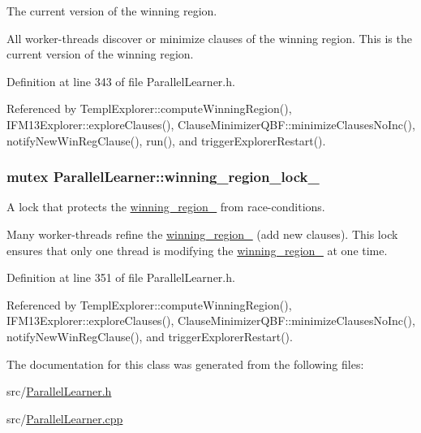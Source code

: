 The current version of the winning region. 

All worker-\/threads discover or minimize clauses of the winning region. This is the current version of the winning region. 

Definition at line 343 of file Parallel\-Learner.\-h.



Referenced by Templ\-Explorer\-::compute\-Winning\-Region(), I\-F\-M13\-Explorer\-::explore\-Clauses(), Clause\-Minimizer\-Q\-B\-F\-::minimize\-Clauses\-No\-Inc(), notify\-New\-Win\-Reg\-Clause(), run(), and trigger\-Explorer\-Restart().

\hypertarget{classParallelLearner_a196a4500dfd66a4b9110659b4a10dead}{
\subsubsection[{winning\-\_\-region\-\_\-lock\-\_\-}]{\setlength{\rightskip}{0pt plus 5cm}mutex Parallel\-Learner\-::winning\-\_\-region\-\_\-lock\-\_\-}}\label{classParallelLearner_a196a4500dfd66a4b9110659b4a10dead}


A lock that protects the \hyperlink{classParallelLearner_a7c8383543ff98d7a0356a237756dcdd6}{winning\-\_\-region\-\_\-} from race-\/conditions. 

Many worker-\/threads refine the \hyperlink{classParallelLearner_a7c8383543ff98d7a0356a237756dcdd6}{winning\-\_\-region\-\_\-} (add new clauses). This lock ensures that only one thread is modifying the \hyperlink{classParallelLearner_a7c8383543ff98d7a0356a237756dcdd6}{winning\-\_\-region\-\_\-} at one time. 

Definition at line 351 of file Parallel\-Learner.\-h.



Referenced by Templ\-Explorer\-::compute\-Winning\-Region(), I\-F\-M13\-Explorer\-::explore\-Clauses(), Clause\-Minimizer\-Q\-B\-F\-::minimize\-Clauses\-No\-Inc(), notify\-New\-Win\-Reg\-Clause(), and trigger\-Explorer\-Restart().



The documentation for this class was generated from the following files\-:\begin{DoxyCompactItemize}
\item 
src/\hyperlink{ParallelLearner_8h}{Parallel\-Learner.\-h}\item 
src/\hyperlink{ParallelLearner_8cpp}{Parallel\-Learner.\-cpp}\end{DoxyCompactItemize}
